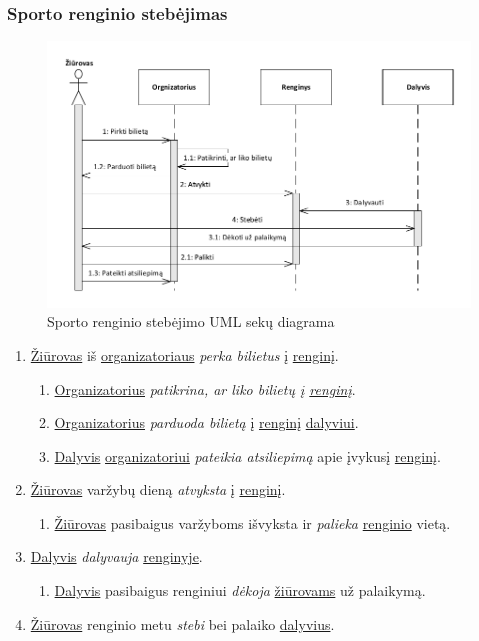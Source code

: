 \documentclass{VUMIFPSkursinis}
\begin{document}
    \subsubsection*{Sporto renginio stebėjimas}
      \begin{figure}[H]
        \centering
        \includegraphics[width=\textwidth]{img/SekuDiagrama5}
        \caption{Sporto renginio stebėjimo UML sekų diagrama}
        \label{fig:stebejimoSekuDiagrama}
      \end{figure}
      \begin{enumerate}
        \item \underline{Žiūrovas} iš \underline{organizatoriaus}  \textit{perka bilietus} į \underline{renginį}.
          \begin{enumerate}
            \item \underline{Organizatorius} \textit{patikrina, ar liko bilietų į \underline{renginį}}.
            \item \underline{Organizatorius} \textit{parduoda bilietą} į \underline{renginį} \underline{dalyviui}.
            \item \underline{Dalyvis} \underline{organizatoriui} \textit{pateikia atsiliepimą} apie įvykusį \underline{renginį}.
          \end{enumerate}
        \item \underline{Žiūrovas} varžybų dieną \textit{atvyksta} į \underline{renginį}.
          \begin{enumerate}
            \item \underline{Žiūrovas} pasibaigus varžyboms išvyksta ir \textit{palieka} \underline{renginio} vietą.
          \end{enumerate}
        \item \underline{Dalyvis} \textit{dalyvauja} \underline{renginyje}.
          \begin{enumerate}
            \item \underline{Dalyvis} pasibaigus renginiui \textit{dėkoja} \underline{žiūrovams} už palaikymą.
          \end{enumerate}
        \item \underline{Žiūrovas} renginio metu \textit{stebi} bei palaiko \underline{dalyvius}.
      \end{enumerate}
\end{document}
